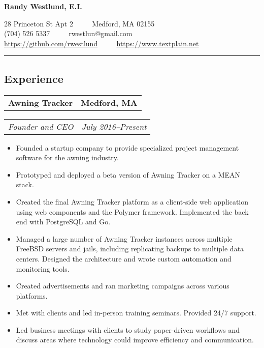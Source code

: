 \documentclass[10pt,letterpaper]{article}
\newcommand{\headerrow}[2]{%
    \begin{tabularx}{\linewidth}{Xr}
	    #1 & #2 \\
    \end{tabularx}
}
\begin{document}
\begin{center}
{\LARGE \textbf{Randy Westlund, E.I.}}

28 Princeton St Apt 2 \ \ \textbullet%
    \ \ Medford, MA 02155 \\
(704) 526 5337 \ \ \textbullet%
    \ \ rwestlun@gmail.com \\
\url{https://github.com/rwestlund} \ \ \textbullet%
    \ \ \url{https://www.textplain.net}
\end{center}

\vspace{2pt}
\hrule
\vspace{-0.4em}
\subsection*{Experience}
	\headerrow{\textbf{Awning Tracker}}{\textbf{Medford, MA}}
	\headerrow{\textit{Founder and CEO}}{\textit{July 2016--Present}}
    \begin{itemize}[label=--]
        \item Founded a startup company to provide specialized project
            management software for the awning industry.

        \item Prototyped and deployed a beta version of Awning Tracker on a
            MEAN stack.

        \item Created the final Awning Tracker platform as a client-side web
            application using web components and the Polymer framework.
            Implemented the back end with PostgreSQL and Go.

        \item Managed a large number of Awning Tracker instances across
            multiple FreeBSD servers and jails, including replicating backups
            to multiple data centers.  Designed the architecture and wrote
            custom automation and monitoring tools.

        \item Created advertisements and ran marketing campaigns across various
            platforms.

        \item Met with clients and led in-person training seminars.  Provided
            24/7 support.

        \item Led business meetings with clients to study paper-driven
            workflows and discuss areas where technology could improve
            efficiency and communication.
	\end{itemize}
\end{document}
